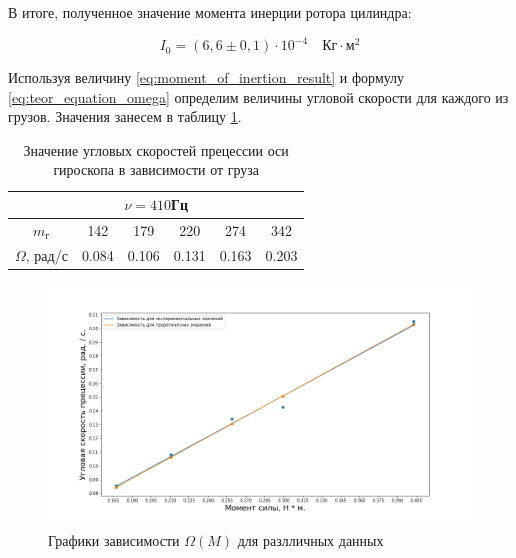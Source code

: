 \documentclass[a4paper, 12pt]{article}
\begin{document}
В итоге, полученное значение момента инерции ротора цилиндра:

\begin{equation}
	I_{0} = \left(6,6 \pm 0,1 \right) \cdot 10^{-4}\quad \text{Кг} \cdot \text{м}^{2}
	\label{eq:moment_of_inertion_result}
\end{equation} 

Используя величину \ref{eq:moment_of_inertion_result} и формулу \ref{eq:teor_equation_omega} определим величины угловой скорости для каждого из грузов. Значения занесем в таблицу \ref{tab:teor_result_Omega_for_diffrent_frequency}.

\begin{table}[h!]
	\centering
		\begin{tabular}{|c|c|c|c|c|c|}
			\hline
			\multicolumn{6}{|c|}{$\nu=410$Гц}                                       \\ \hline
			$m_г$           & 142       & 179       & 220       & 274       & 342   \\ \hline
			$\Omega$, рад/с & 0.084     & 0.106     & 0.131     & 0.163     & 0.203 \\ \hline
		\end{tabular}
		\caption{Значение угловых скоростей прецессии оси гироскопа в зависимости от груза}
		\label{tab:teor_result_Omega_for_diffrent_frequency}
\end{table}

\begin{figure}[h!]
	\begin{center}
		\includegraphics[width = \textwidth]{Omega-Counted.png}
		\caption{Графики зависимости $\Omega(M)$ для разлличных данных}
		\label{fig:diffrent_dependence_Omega}
	\end{center}
\end{figure}
\end{document}
